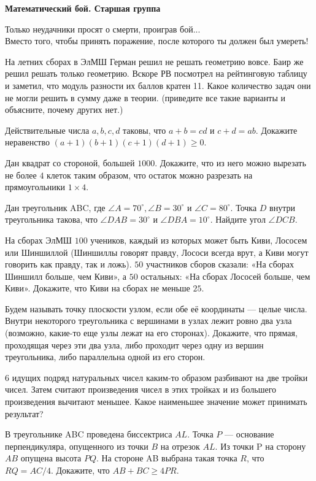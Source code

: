 \centerline{\bf \Huge Математический бой. Старшая группа}

\begin{flushright}
        \scriptsize{Только неудачники просят о смерти, проиграв бой... \\Вместо того, чтобы принять поражение, после которого ты должен был умереть!}
\end{flushright}

 На летних сборах в ЭлМШ Герман решил не решать геометрию вовсе. Баир же решил решать только геометрию. Вскоре РВ посмотрел на рейтинговую таблицу и заметил, что модуль разности их баллов кратен 11. Какое количество задач они не могли решить в сумму даже в теории. (приведите все такие варианты и объясните, почему других нет.)

 Действительные числа $a, b, c, d$ таковы, что $a+b = cd$ и $c+d = ab.$ Докажите неравенство $(a+1)(b+1)(c+1)(d+1) \geq 0$.

Дан квадрат со стороной, большей $1000$. Докажите, что из него можно вырезать не более $4$ клеток таким образом, что остаток можно разрезать на прямоугольники $1\times4$.

Дан треугольник ABC, где $\angle A = 70^{\circ}, \angle B = 30^{\circ}$ и $\angle C = 80^{\circ}$. Точка $D$ внутри треугольника такова, что $\angle DAB = 30^{\circ}$ и $\angle DBA = 10^{\circ}.$ Найдите угол $\angle DCB.$

На сборах ЭлМШ $100$ учеников, каждый из которых может быть Киви, Лососем или Шиншиллой (Шиншиллы говорят правду, Лососи всегда врут, а Киви могут говорить как правду, так и ложь). $50$ участников сборов сказали: «На сборах Шиншилл больше, чем Киви», а $50$ остальных: «На сборах Лососей больше, чем Киви». Докажите, что Киви на сборах не меньше $25.$


Будем называть точку плоскости узлом, если обе её координаты --- целые числа. Внутри некоторого треугольника с вершинами в узлах лежит ровно два узла (возможно, какие-то еще узлы лежат на его сторонах). Докажите, что прямая, проходящая через эти два узла, либо проходит через одну из вершин треугольника, либо параллельна одной из его сторон.



6 идущих подряд натуральных чисел каким-то образом разбивают на две тройки чисел. Затем считают произведения чисел в этих тройках и из большего произведения вычитают меньшее. Какое наименьшее значение может принимать результат?

В треугольнике ABC проведена биссектриса $AL$. Точка $P$ --- основание перпендикуляра, опущенного из точки $B$ на отрезок $AL$. Из точки P на сторону $AB$ опущена высота $PQ$. На стороне AB выбрана такая точка $R$, что $RQ = AC/4.$ Докажите, что $AB+BC \geq 4PR.$